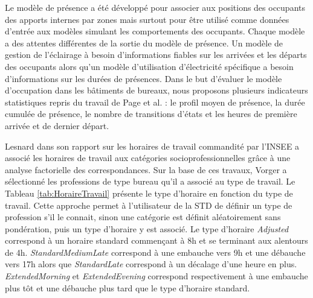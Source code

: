 Le modèle de présence a été développé pour associer aux positions des occupants des apports internes par zones mais surtout pour être utilisé comme données d'entrée aux modèles simulant les comportements des occupants. Chaque modèle a des attentes différentes de la sortie du modèle de présence. Un modèle de gestion de l'éclairage à besoin d'informations fiables sur les arrivées et les départs des occupants alors qu'un modèle d'utilisation d'électricité spécifique a besoin d'informations sur les durées de présences. Dans le but d'évaluer le modèle d'occupation dans les bâtiments de bureaux, nous proposons plusieurs indicateurs statistiques repris du travail de Page et al. \cite{Page-08}: le profil moyen de présence, la durée cumulée de présence, le nombre de transitions d'états et les heures de première arrivée et de dernier départ.

Lesnard \cite{Lesnard-06} dans son rapport sur les horaires de travail commandité par l'INSEE a associé les horaires de travail aux catégories socioprofessionnelles grâce à une analyse factorielle des correspondances. Sur la base de ces travaux, Vorger \cite{Vorger-14} a sélectionné les professions de type bureau qu'il a associé au type de travail. Le Tableau \ref{tab:HoraireTravail} présente le type d'horaire en fonction du type de travail. Cette approche permet à l'utilisateur de la STD de définir un type de profession s'il le connait, sinon une catégorie est définit aléatoirement sans pondération, puis un type d'horaire y est associé. Le type d'horaire \textit{Adjusted} correspond à un horaire standard commençant à 8h et se terminant aux alentours de 4h. \textit{StandardMediumLate} correspond à une embauche vers 9h et une débauche vers 17h alors que \textit{StandardLate} correspond à un décalage d'une heure en plus. \textit{ExtendedMorning} et \textit{ExtendedEvening} correspond respectivement à une embauche plus tôt et une débauche plus tard que le type d'horaire standard.

